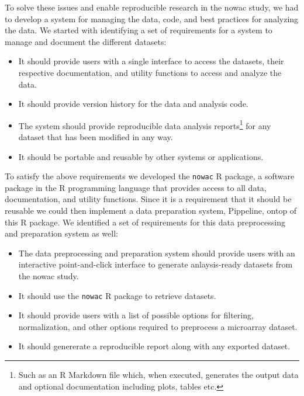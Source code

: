 To solve these issues and enable reproducible research in the \gls{nowac} study,
we had to develop a system for managing the data, code, and best practices for
analyzing the data. We started with identifying a set of requirements for a
system to manage and document the different datasets: 

\begin{itemize} 
    \item It should provide users with a single interface to access the
        datasets, their respective documentation, and utility functions to
        access and analyze the data.
    \item It should provide version history for the data and analysis code. 
    \item The system should provide reproducible data analysis
        reports\footnote{Such as an R Markdown file which, when executed,
        generates the output data and optional documentation including plots,
        tables etc.} for any dataset that has been modified in any way. 
    \item It should be portable and reusable by other systems or applications. 
\end{itemize} 

To satisfy the above requirements we developed the \texttt{nowac} R package, a
software package in the R programming language that provides access to all data,
documentation, and utility functions. Since it is a requirement that it should
be reusable we could then implement a data preparation system, Pippeline, ontop
of this R package. We identified a set of requirements for this data
preprocessing and preparation system as well: 

\begin{itemize} 
    \item The data preprocessing and preparation system should provide users
        with an interactive point-and-click interface to generate anlaysis-ready
        datasets from the \gls{nowac} study. 
    \item It should use the \texttt{nowac} R package to retrieve datasets. 
    \item It should provide users with a list of possible options for filtering,
        normalization, and other options required to preprocess a microarray
        dataset.
    \item It should genererate a reproducible report along with any exported
        dataset.
\end{itemize} 

